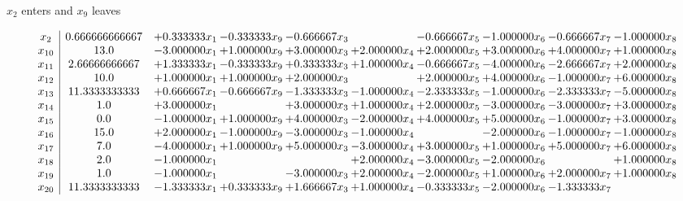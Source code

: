 \documentclass[10pt]{article}
\begin{document}
 $ x_{2} $ enters and $ x_{9} $ leaves 

 \[\begin{array}{c| c c@{\hskip 2pt} c@{\hskip 2pt} c@{\hskip 2pt} c@{\hskip 2pt} c@{\hskip 2pt} c@{\hskip 2pt} c@{\hskip 2pt} c@{\hskip 2pt} }
 x_{2}   &  0.666666666667 & + 0.333333 x_{1} & -0.333333 x_{9} & -0.666667 x_{3} &   & -0.666667 x_{5} & -1.000000 x_{6} & -0.666667 x_{7} & -1.000000 x_{8}\\
 x_{10}   &  13.0 & -3.000000 x_{1} & + 1.000000 x_{9} & + 3.000000 x_{3} & + 2.000000 x_{4} & + 2.000000 x_{5} & + 3.000000 x_{6} & + 4.000000 x_{7} & + 1.000000 x_{8}\\
 x_{11}   &  2.66666666667 & + 1.333333 x_{1} & -0.333333 x_{9} & + 0.333333 x_{3} & + 1.000000 x_{4} & -0.666667 x_{5} & -4.000000 x_{6} & -2.666667 x_{7} & + 2.000000 x_{8}\\
 x_{12}   &  10.0 & + 1.000000 x_{1} & + 1.000000 x_{9} & + 2.000000 x_{3} &   & + 2.000000 x_{5} & + 4.000000 x_{6} & -1.000000 x_{7} & + 6.000000 x_{8}\\
 x_{13}   &  11.3333333333 & + 0.666667 x_{1} & -0.666667 x_{9} & -1.333333 x_{3} & -1.000000 x_{4} & -2.333333 x_{5} & -1.000000 x_{6} & -2.333333 x_{7} & -5.000000 x_{8}\\
 x_{14}   &  1.0 & + 3.000000 x_{1} &   & + 3.000000 x_{3} & + 1.000000 x_{4} & + 2.000000 x_{5} & -3.000000 x_{6} & -3.000000 x_{7} & + 3.000000 x_{8}\\
 x_{15}   &  0.0 & -1.000000 x_{1} & + 1.000000 x_{9} & + 4.000000 x_{3} & -2.000000 x_{4} & + 4.000000 x_{5} & + 5.000000 x_{6} & -1.000000 x_{7} & + 3.000000 x_{8}\\
 x_{16}   &  15.0 & + 2.000000 x_{1} & -1.000000 x_{9} & -3.000000 x_{3} & -1.000000 x_{4} &   & -2.000000 x_{6} & -1.000000 x_{7} & -1.000000 x_{8}\\
 x_{17}   &  7.0 & -4.000000 x_{1} & + 1.000000 x_{9} & + 5.000000 x_{3} & -3.000000 x_{4} & + 3.000000 x_{5} & + 1.000000 x_{6} & + 5.000000 x_{7} & + 6.000000 x_{8}\\
 x_{18}   &  2.0 & -1.000000 x_{1} &    &   & + 2.000000 x_{4} & -3.000000 x_{5} & -2.000000 x_{6} &   & + 1.000000 x_{8}\\
 x_{19}   &  1.0 & -1.000000 x_{1} &   & -3.000000 x_{3} & + 2.000000 x_{4} & -2.000000 x_{5} & + 1.000000 x_{6} & + 2.000000 x_{7} & + 1.000000 x_{8}\\
 x_{20}   &  11.3333333333 & -1.333333 x_{1} & + 0.333333 x_{9} & + 1.666667 x_{3} & + 1.000000 x_{4} & -0.333333 x_{5} & -2.000000 x_{6} & -1.333333 x_{7} &   \\

\end{array}\]
\end{document}
